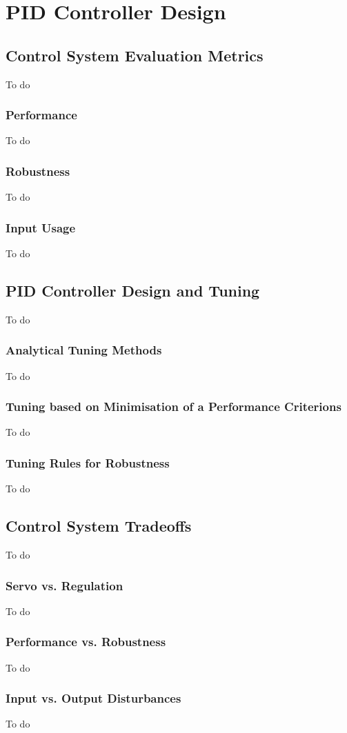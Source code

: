 \chapter{PID Controller Design}
\label{chap:PIDControllerDesign}

\section{Control System Evaluation Metrics}
To do
\subsection{Performance}
To do
\subsection{Robustness}
To do
\subsection{Input Usage}
To do
%
\section{PID Controller Design and Tuning}
To do
\subsection{Analytical Tuning Methods}
To do
\subsection{Tuning based on Minimisation of a Performance Criterions}
To do
\subsection{Tuning Rules for Robustness}
To do
%
\section{Control System Tradeoffs}
To do
\subsection{Servo vs. Regulation}
To do
\subsection{Performance vs. Robustness}
To do
\subsection{Input vs. Output Disturbances}
To do